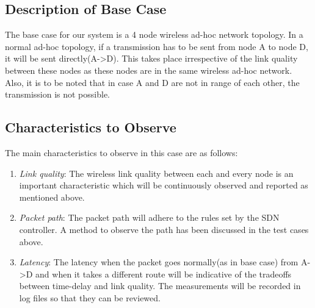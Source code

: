 \documentclass{article}
\begin{document}
\subsection{Description of Base Case}
The base case for our system is a 4 node wireless ad-hoc network topology. In a normal ad-hoc topology, if a
transmission has to be sent from node A to node D, it will be sent directly(A-\textgreater D). This takes place irrespective of the
link quality between these nodes as these nodes are in the same wireless ad-hoc network. Also, it is to be noted that in
case A and D are not in range of each other, the transmission is not possible.
\subsection{Characteristics to Observe}
The main characteristics to observe in this case are as follows:
\begin{enumerate}
\item \textit{Link quality}: The wireless link quality between each and every node is an important characteristic which will be
continuously observed and reported as mentioned above. 
\item \textit{Packet path}: The packet path will adhere to the rules set by the SDN controller. A method to observe the path has
been discussed in the test cases above. 
\item \textit{Latency}: The latency when the packet goes normally(as in base case) from A-\textgreater D and when it takes a different route
will be indicative of the tradeoffs between time-delay and link quality. The measurements will be recorded in log files
so that they can be reviewed.
\end{enumerate}
\end{document}
